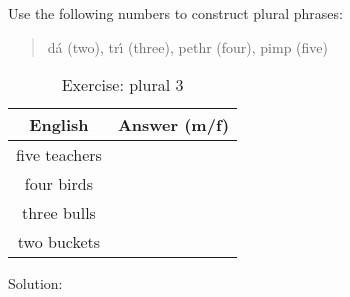 Use the following numbers to construct plural phrases:\\
\begin{quote}
d\'{a} (two), tr\'{\i} (three), pethr (four), pimp (five)
\end{quote}

\begin{table}[H]
\centering
\begin{tabu}{|c|p{10.0cm}|}
  \toprule
  \textbf{English} & \textbf{Answer (m/f)}\\
  \toprule
  five teachers & \\
  \midrule
  four birds & \\
  \midrule
  three bulls & \\
  \midrule
  two buckets & \\
  \bottomrule
\end{tabu}
\label{exercise_plural_3}
\caption{Exercise: plural 3}
\end{table}

\newpage
Solution:
\begin{table}[H]
\centering
\label{solution_plural_3}
\caption{Solution: plural 3}
\end{table}
